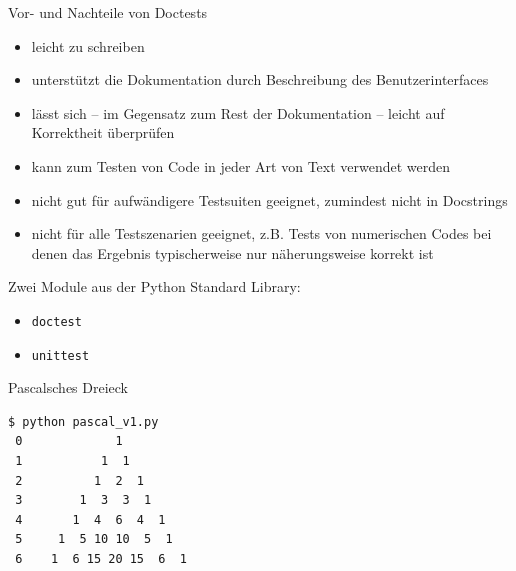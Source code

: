 \documentclass[t, utf8x, 10pt]{beamer}
\newcommand\pro{\textcolor{pro}{\faicon{smile-o}}}
\newcommand\contra{\textcolor{contra}{\faicon{frown-o}}}
\begin{document}
\begin{frame}[c]{Vor- und Nachteile von Doctests}
 \begin{itemize}
  \item[\pro]    leicht zu schreiben
  \item[\pro]    unterstützt die Dokumentation durch Beschreibung des
	         Benutzerinterfaces
  \item[\pro]    lässt sich -- im Gegensatz zum Rest der Dokumentation -- leicht
	         auf Korrektheit überprüfen
  \item[\pro]    kann zum Testen von Code in jeder Art von Text verwendet
                 werden\\[0.5truecm]
  \item[\contra] nicht gut für aufwändigere Testsuiten geeignet, zumindest nicht
	         in Docstrings
  \item[\contra] nicht für alle Testszenarien geeignet, z.B. Tests
	         von numerischen Codes bei denen das Ergebnis typischerweise
		 nur näherungsweise korrekt ist
 \end{itemize}
\end{frame}


\begin{frame}[c]
 \begin{Large}
  Zwei Module aus der Python Standard Library:
  \begin{itemize}
   \item<1> \texttt{doctest}
   \item<1-2>   \texttt{unittest}
  \end{itemize}
 \end{Large}
\end{frame}


\begin{frame}[fragile]{Pascalsches Dreieck}
 \begin{small}
  

  \begin{lstlisting}[language={}]
 $ python pascal_v1.py 
 0             1           
 1           1  1          
 2          1  2  1        
 3        1  3  3  1       
 4       1  4  6  4  1     
 5     1  5 10 10  5  1    
 6    1  6 15 20 15  6  1 
  \end{lstlisting}
 \end{small}
\end{frame}
\end{document}
